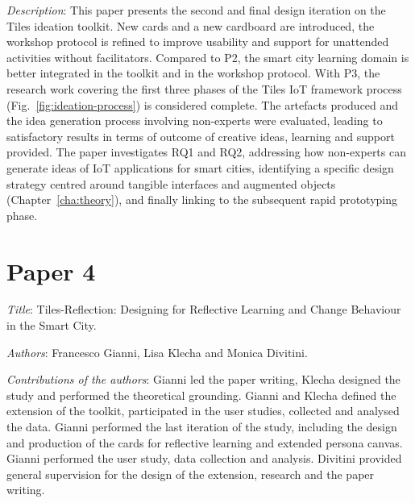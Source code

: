 \emph{Description}: This paper presents the second and final design iteration on the Tiles ideation toolkit. New cards and a new cardboard are introduced, the workshop protocol is refined to improve usability and support for unattended activities without facilitators. Compared to P2, the smart city learning domain is better integrated in the toolkit and in the workshop protocol.
With P3, the research work covering the first three phases of the Tiles IoT framework process (Fig.~\ref{fig:ideation-process}) is considered complete. The artefacts produced and the idea generation process involving non-experts were evaluated, leading to satisfactory results in terms of outcome of creative ideas, learning and support provided. The paper investigates RQ1 and RQ2, addressing how non-experts can generate ideas of IoT applications for smart cities, identifying a specific design strategy centred around tangible interfaces and augmented objects (Chapter~\ref{cha:theory}), and finally linking to the subsequent rapid prototyping phase.


\section[P4: Tiles-Reflection: Designing for Reflective Learning and Change Behaviour in the Smart City.][Paper 4]{Paper 4}
\label{paper-4}

\emph{Title}: Tiles-Reflection: Designing for Reflective Learning and Change Behaviour in the Smart City.

\emph{Authors}: Francesco Gianni, Lisa Klecha and Monica Divitini.

\emph{Contributions of the authors}: Gianni led the paper writing, Klecha designed the study and performed the theoretical grounding. Gianni and Klecha defined the extension of the toolkit, participated in the user studies, collected and analysed the data. Gianni performed the last iteration of the study, including the design and production of the cards for reflective learning and extended persona canvas. Gianni performed the user study, data collection and analysis. Divitini provided general supervision for the design of the extension, research and the paper writing.

